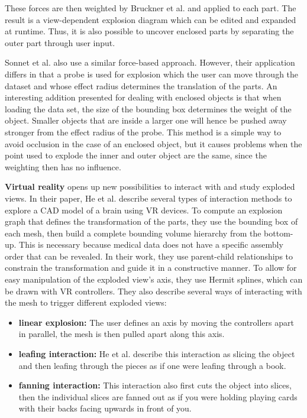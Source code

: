 These forces are then weighted by Bruckner et al. and applied to each part. %
The result is a view-dependent explosion diagram which can be edited and expanded at runtime. 
Thus, it is also possible to uncover enclosed parts by separating the outer part through user input.

Sonnet et al. also use a similar force-based approach.\cite{Sonnet_2004}
However, their application differs in that a probe is used for explosion which the user can move through the dataset and whose effect radius determines the translation of the parts. 
An interesting addition presented for dealing with enclosed objects is that when loading the data set, the size of the bounding box determines the weight of the object. 
Smaller objects that are inside a larger one will hence be pushed away stronger from the effect radius of the probe. 
This method is a simple way to avoid occlusion in the case of an enclosed object, but it causes problems when the point used to explode the inner and outer object are the same, since the weighting then has no influence.

\textbf{Virtual reality} opens up new possibilities to interact with and study exploded views. In their paper, He et al. describe several types of interaction methods to explore a CAD model of a brain using VR devices.\cite{He2017}
To compute an explosion graph that defines the transformation of the parts, they use the bounding box of each mesh, then build a complete bounding volume hierarchy from the bottom-up.
This is necessary because medical data does not have a specific assembly order that can be revealed. 
In their work, they use parent-child relationships to constrain the transformation and guide it in a constructive manner.
To allow for easy manipulation of the exploded view's axis, they use Hermit splines, which can be drawn with VR controllers. They also describe several ways of interacting with the mesh to trigger different exploded views:

\begin{itemize}
	\item \textbf{linear explosion:} The user defines an axis by moving the controllers apart in parallel, the mesh is then pulled apart along this axis.
	\item \textbf{leafing interaction:} He et al. describe this interaction as slicing the object and then leafing through the pieces as if one were leafing through a book.
	\item \textbf{fanning interaction:} This interaction also first cuts the object into slices, then the individual slices are fanned out as if you were holding playing cards with their backs facing upwards in front of you. 
\end{itemize}

